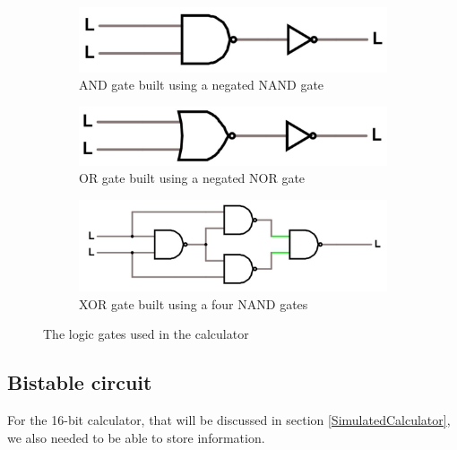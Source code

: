\documentclass{article}
\begin{document}
\begin{figure}[h]
    \centering
    \begin{subfigure}{.49\textwidth}
        \centering
        \includegraphics[scale=.3]{IM_AND_LOGIC.JPG}
        \caption{AND gate built using a negated NAND gate}
    \end{subfigure}
    \hfill
    \begin{subfigure}{.49\textwidth}
        \centering
        \includegraphics[scale=.3]{IM_OR_LOGIC.JPG}
        \caption{OR gate built using a negated NOR gate}       
    \end{subfigure}
    \vspace{2mm}
    \begin{subfigure}{\textwidth}
        \centering
        \includegraphics[scale=.3]{IM_XOR_LOGIC.JPG}
        \caption{XOR gate built using a four NAND gates}     
        \label{XOR_NANDs}     
    \end{subfigure}
    \caption{The logic gates used in the calculator}
    \label{UsefulGates}
\end{figure}
\clearpage
\subsection{Bistable circuit}

For the 16-bit calculator, that will be discussed in section \ref{SimulatedCalculator}, we also needed to be able to store information.

\vspace{1mm}
\end{document}
